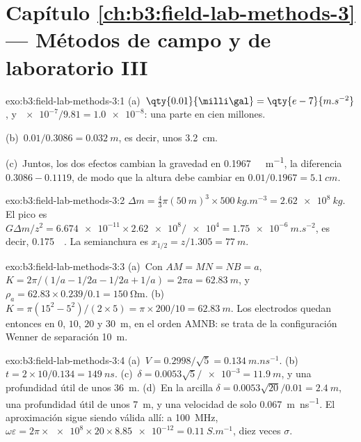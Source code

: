 \section*{Capítulo \ref{ch:b3:field-lab-methods-3} --- Métodos de campo y de laboratorio III}

\begin{solution}{exo:b3:field-lab-methods-3:1}
(a)~$\qty{0.01}{\milli\gal} = \qty{e-7}{m.s^{-2}}$, y
$\num{e-7}/\num{9.81} = \num{1.0e-8}$: una parte en cien millones.

(b)~$0.01/0.3086 = \qty{0.032}{m}$, es decir, unos \qty{3.2}{cm}.

(c)~Juntos, los dos efectos cambian la gravedad en
\qty{0.1967}{\milli\gal.m^{-1}}, la diferencia $0.3086 - 0.1119$, de modo que
la altura debe cambiar en $0.01/0.1967 = \qty{5.1}{cm}$.
\end{solution}

\begin{solution}{exo:b3:field-lab-methods-3:2}
$\Delta m = \tfrac43\pi(\qty{50}{m})^3\times\qty{500}{kg.m^{-3}} =
\qty{2.62e8}{kg}$. El pico es $G\Delta m/z^2 =
\num{6.674e-11}\times\num{2.62e8}/\num{e4} = \qty{1.75e-6}{m.s^{-2}}$,
es decir, \qty{0.175}{\milli\gal}. La semianchura es $x_{1/2} = z/1.305 =
\qty{77}{m}$.
\end{solution}

\begin{solution}{exo:b3:field-lab-methods-3:3}
(a)~Con $AM = MN = NB = a$, $K = 2\pi/(1/a - 1/2a - 1/2a + 1/a) =
2\pi a = \qty{62.83}{m}$, y $\rho_a = 62.83\times0.239/0.1 =
\qty{150}{\ohm\metre}$. (b)~$K = \pi(15^2 - 5^2)/(2\times5) = \pi\times
200/10 = \qty{62.83}{m}$. Los electrodos quedan entonces en $0$, $10$, $20$
y \qty{30}{m}, en el orden AMNB: se trata de la configuración Wenner de separación
\qty{10}{m}.
\end{solution}

\begin{solution}{exo:b3:field-lab-methods-3:4}
(a)~$V = 0.2998/\sqrt5 = \qty{0.134}{m.ns^{-1}}$. (b)~$t =
2\times10/0.134 = \qty{149}{ns}$. (c)~$\delta = 0.0053\sqrt5/\num{e-3} =
\qty{11.9}{m}$, y una profundidad útil de unos \qty{36}{m}. (d)~En la arcilla
$\delta = 0.0053\sqrt{20}/0.01 = \qty{2.4}{m}$, una profundidad útil de unos
\qty{7}{m}, y una velocidad de solo \qty{0.067}{m.ns^{-1}}. El
aproximación sigue siendo válida allí: a \qty{100}{MHz},
$\omega\varepsilon = 2\pi\times\num{e8}\times20\times\num{8.85e-12} =
\qty{0.11}{S.m^{-1}}$, diez veces $\sigma$.
\end{solution}

